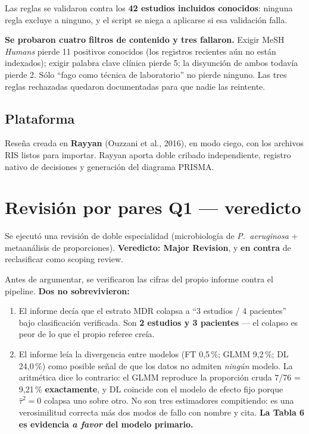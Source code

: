 \documentclass[11pt,a4paper]{article}
\begin{document}
Las reglas se validaron contra los \textbf{42 estudios incluidos conocidos}:
ninguna regla excluye a ninguno, y el script se niega a aplicarse si esa
validación falla.

\textbf{Se probaron cuatro filtros de contenido y tres fallaron.} Exigir MeSH
\textit{Humans} pierde 11 positivos conocidos (los registros recientes aún no
están indexados); exigir palabra clave clínica pierde 5; la disyunción de ambos
todavía pierde 2. Sólo ``fago como técnica de laboratorio'' no pierde ninguno.
Las tres reglas rechazadas quedaron documentadas para que nadie las reintente.

\subsection{Plataforma}

Reseña creada en \textbf{Rayyan} (Ouzzani et al., 2016), en modo ciego, con los
archivos RIS listos para importar. Rayyan aporta doble cribado independiente,
registro nativo de decisiones y generación del diagrama PRISMA.

\section{Revisión por pares Q1 --- veredicto}

Se ejecutó una revisión de doble especialidad (microbiología de \textit{P.\
aeruginosa} + metaanálisis de proporciones). \textbf{Veredicto: Major Revision},
y \textbf{en contra} de reclasificar como scoping review.

Antes de argumentar, se verificaron las cifras del propio informe contra el
pipeline. \textbf{Dos no sobrevivieron:}

\begin{enumerate}[leftmargin=1.5em,itemsep=3pt]
\item El informe decía que el estrato MDR colapsa a ``3 estudios / 4 pacientes''
bajo clasificación verificada. Son \textbf{2 estudios y 3 pacientes} --- el
colapso es peor de lo que el propio referee creía.
\item El informe leía la divergencia entre modelos (FT 0{,}5\,\%; GLMM 9{,}2\,\%;
DL 24{,}0\,\%) como posible señal de que los datos no admiten \emph{ningún}
modelo. La aritmética dice lo contrario: el GLMM reproduce la proporción cruda
7/76 = 9{,}21\,\% \textbf{exactamente}, y DL coincide con el modelo de efecto fijo
porque $\hat\tau^2 = 0$ colapsa uno sobre otro. No son tres estimadores
compitiendo: es una verosimilitud correcta más dos modos de fallo con nombre y
cita. \textbf{La Tabla 6 es evidencia \emph{a favor} del modelo primario.}
\end{enumerate}
\end{document}
